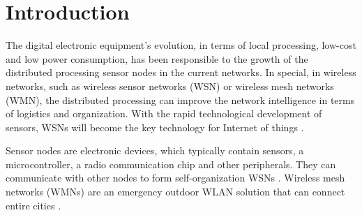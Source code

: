 
\section{Introduction}
The digital electronic equipment’s evolution, in terms of local processing, low-cost and low power consumption, has been responsible to the growth of the distributed processing sensor nodes in the current networks. In special, in wireless networks, such as wireless sensor networks (WSN) or wireless mesh networks (WMN), the distributed processing can improve the network intelligence in terms of logistics and organization. With the rapid technological development of sensors, WSNs will become the key technology for Internet of things \cite{IEC2014}.

Sensor nodes are electronic devices, which typically contain sensors, a microcontroller, a radio communication chip and other peripherals. They can communicate with other nodes to form self-organization WSNs \cite{Son2009}. Wireless mesh networks (WMNs) are an emergency outdoor WLAN solution that can connect entire cities \cite{Akyildiz2009}.





